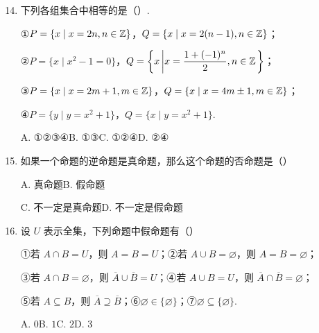 \documentclass[a4paper,11pt]{article}
\begin{document}

\begin{enumerate}
\setcounter{enumi}{13}

\item 下列各组集合中相等的是\mbox{（\quad）.}

①$P=\{x\mid x=2n,n\in\mathbb{Z}\}$，$Q=\{x\mid x=2(n-1),n\in\mathbb{Z}\}$；

②$P=\{x\mid x^2-1=0\}$，$Q=\left\{x\left|x=\dfrac{1+(-1)^n}{2},n\in\mathbb{Z}\right.\right\}$；

③$P=\{x\mid x=2m+1,m\in\mathbb{Z}\}$，$Q=\{x\mid x=4m\pm 1,m\in\mathbb{Z}\}$；

④$P=\{y\mid y=x^2+1\}$，$Q=\{x\mid y=x^2+1\}$.

\keepwithprev
A. ①②③④\qquad B. ①③\qquad C. ①②④\qquad D. ②④


\item 如果一个命题的逆命题是真命题，那么这个命题的否命题是\mbox{（\quad）}

\keepwithprev
A. 真命题\qquad B. 假命题

C. 不一定是真命题\qquad D. 不一定是假命题


\ifanswer
\solbegin
{}
\solend

\fi

\item 设 $U$ 表示全集，下列命题中假命题有\mbox{（\quad）}

①若 $A\cap B=U$，则 $A=B=U$；②若 $A\cup B=\varnothing$，则 $A=B=\varnothing$；

③若 $A\cap B=\varnothing$，则 $\overline{A}\cup\overline{B}=U$；④若 $A\cup B=U$，则 $\overline{A}\cap\overline{B}=\varnothing$；

⑤若 $A\subseteq B$，则 $\overline{A}\supseteq\overline{B}$；⑥$\varnothing\in\{\varnothing\}$；⑦$\varnothing\subseteq\{\varnothing\}$.

\keepwithprev
A. $0$\qquad B. $1$\qquad C. $2$\qquad D. $3$


\ifanswer
\solbegin
{}
\solend

\fi

\end{enumerate}

\end{document}
